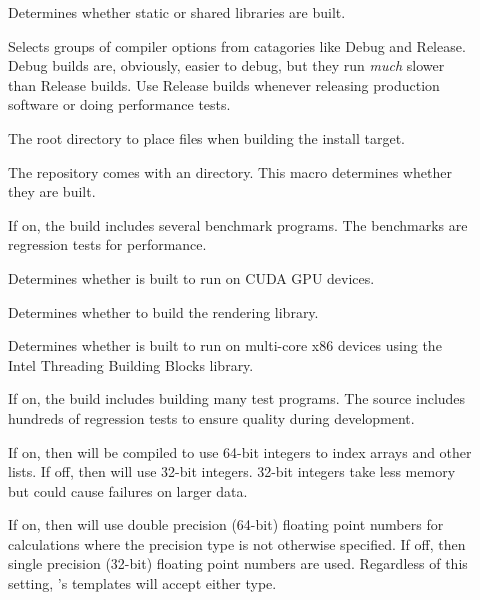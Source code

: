 \begin{description}
\item[]
  Determines whether static or shared libraries are built.
\item[]
   
  Selects groups of compiler options from catagories like Debug and Release.
  Debug builds are, obviously, easier to debug, but they run \emph{much} slower than Release builds.
  Use Release builds whenever releasing production software or doing performance tests.
\item[]
  The root directory to place files when building the install target.
\item[]
  The \VTKm repository comes with an  directory.
  This macro determines whether they are built.
\item[]
  If on, the \VTKm build includes several benchmark programs.
  The benchmarks are regression tests for performance.
\item[]
  Determines whether \VTKm is built to run on CUDA GPU devices.
\item[]
  Determines whether to build the rendering library.
\item[]
  Determines whether \VTKm is built to run on multi-core x86 devices using the Intel Threading Building Blocks library.
\item[]
  If on, the \VTKm build includes building many test programs.
  The \VTKm source includes hundreds of regression tests to ensure quality during development.
\item[]
  If on, then \VTKm will be compiled to use 64-bit integers to index arrays and other lists.
  If off, then \VTKm will use 32-bit integers.
  32-bit integers take less memory but could cause failures on larger data.
\item[]
  If on, then \VTKm will use double precision (64-bit) floating point numbers for calculations where the precision type is not otherwise specified.
  If off, then single precision (32-bit) floating point numbers are used.
  Regardless of this setting, \VTKm's templates will accept either type.
\end{description}

